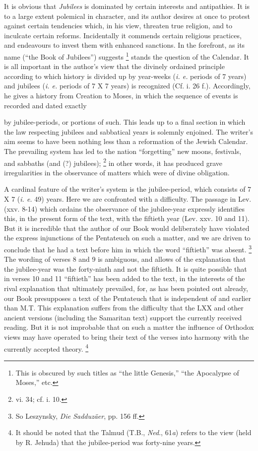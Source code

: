 It is obvious that \emph{Jubilees} is dominated by certain interests and antipathies. It is to a large extent polemical in character, and its author desires at once to protest against certain tendencies which, in his view, threaten true religion, and to inculcate certain reforms. Incidentally it commends certain religious practices, and endeavours to invest them with enhanced sanctions. In the forefront, as its name (``the Book of Jubilees'') suggests \footnote{This is obscured by such titles as ``the little Genesis,'' ``the Apocalypse of Moses,'' etc.} stands the question of the Calendar. It is all important in the author's view that the divinely ordained principle according to which history is divided up by year-weeks (\emph{i. e.} periods of 7 years) and jubilees (\emph{i. e.} periods of 7 X 7 years) is recognized (Cf. i. 26 f.). Accordingly, he gives a history from Creation to Moses, in which the sequence of events is recorded and dated exactly

by jubilee-periods, or portions of such. This leads up to a final section in which the law respecting jubilees and sabbatical years is solemnly enjoined. The writer's aim seems to have been nothing less than a reformation of the Jewish Calendar. The prevailing system has led to the nation ``forgetting'' new moons, festivals, and sabbaths (and (?) jubilees); \footnote{vi. 34; cf. i. 10.} in other words, it has produced grave irregularities in the observance of matters which were of divine obligation.

A cardinal feature of the writer's system is the jubilee-period, which consists of 7 X 7 (\emph{i. e.} 49) years. Here we are confronted with a difficulty. The passage in Lev. (xxv. 8-14) which ordains the observance of the jubilee-year expressly identifies this, in the present form of the text, with the fiftieth year (Lev. xxv. 10 and 11). But it is incredible that the author of our Book would deliberately have violated the express injunctions of the Pentateuch on such a matter, and we are driven to conclude that he had a text before him in which the word ``fiftieth'' was absent. \footnote{So Leszynsky, \emph{Die Sadduzäer}, pp. 156 ff.} The wording of verses 8 and 9 is ambiguous, and allows of the explanation that the jubilee-year was the forty-ninth and not the fiftieth. It is quite possible that in verses 10 and 11 ``fiftieth'' has been added to the text, in the interests of the rival explanation that ultimately prevailed, for, as has been pointed out already, our Book presupposes a text of the Pentateuch that is independent of and earlier than M.T. This explanation suffers from the difficulty that the LXX and other ancient versions (including the Samaritan text) support the currently received reading. But it is not improbable that on such a matter the influence of Orthodox views may have operated to bring their text of the verses into harmony with the currently accepted theory. \footnote{It should be noted that the Talmud (T.B., \emph{Ned}., 61\emph{a}) refers to the view (held by R. Jehuda) that the jubilee-period was forty-nine years.}

